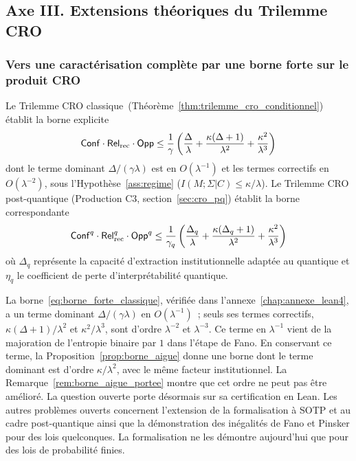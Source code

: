 \subsection{Axe III. Extensions th\'eoriques du Trilemme CRO}
\label{subsec:axe3_extensions}
\begin{sloppypar}

\subsubsection{Vers une caract\'erisation compl\`ete par une borne forte sur le produit CRO}
\label{subsubsec:borne_forte}

Le Trilemme CRO classique~(Th\'eor\`eme~\ref{thm:trilemme_cro_conditionnel})
\'etablit la borne explicite
\begin{equation}
\mathsf{Conf} \cdot \mathsf{Rel}_{\mathrm{rec}} \cdot \mathsf{Opp} \leq \frac{1}{\gamma}\left(\frac{\Delta}{\lambda} + \frac{\kappa(\Delta+1)}{\lambda^2} + \frac{\kappa^2}{\lambda^3}\right)
\label{eq:borne_forte_classique}
\end{equation}
dont le terme dominant $\Delta/(\gamma\lambda)$ est en $O(\lambda^{-1})$ et les
termes correctifs en $O(\lambda^{-2})$, sous l'Hypoth\`ese~\ref{ass:regime}
($I(M;\Sigma|C) \leq \kappa/\lambda$). Le Trilemme CRO post-quantique
(Production C3, section~\ref{sec:cro_pq}) \'etablit la borne correspondante
\begin{equation}
\mathsf{Conf}^q \cdot \mathsf{Rel}_{\mathrm{rec}}^q \cdot \mathsf{Opp}^q \leq \frac{1}{\gamma_q}\left(\frac{\Delta_q}{\lambda} + \frac{\kappa(\Delta_q+1)}{\lambda^2} + \frac{\kappa^2}{\lambda^3}\right)
\label{eq:borne_forte_quantique}
\end{equation}
o\`u $\Delta_q$ repr\'esente la capacit\'e d'extraction institutionnelle
adapt\'ee au quantique et $\eta_q$ le coefficient de perte d'interpr\'etabilit\'e
quantique.

\begin{remark}
\label{rem:borne_forte_statut}
La borne~\eqref{eq:borne_forte_classique}, v\'erifi\'ee dans
l'annexe~\ref{chap:annexe_lean4}, a un terme dominant $\Delta/(\gamma\lambda)$ en
$O(\lambda^{-1})$~; seuls ses termes correctifs, $\kappa(\Delta+1)/\lambda^2$ et
$\kappa^2/\lambda^3$, sont d'ordre $\lambda^{-2}$ et $\lambda^{-3}$. Ce terme en
$\lambda^{-1}$ vient de la majoration de l'entropie binaire par $1$ dans l'\'etape de
Fano. En conservant ce terme, la Proposition~\ref{prop:borne_aigue} donne une borne
dont le terme dominant est d'ordre $\kappa/\lambda^2$, avec le m\^eme facteur
institutionnel. La Remarque~\ref{rem:borne_aigue_portee} montre que cet ordre ne
peut pas \^etre am\'elior\'e. La question ouverte porte d\'esormais sur sa certification
en Lean. Les autres probl\`emes ouverts concernent l'extension de la
formalisation \`a SOTP et au cadre post-quantique ainsi que la d\'emonstration des
in\'egalit\'es de Fano et Pinsker pour des lois quelconques. La formalisation ne les
d\'emontre aujourd'hui que pour des lois de probabilit\'e finies.
\end{remark}


\end{sloppypar}
